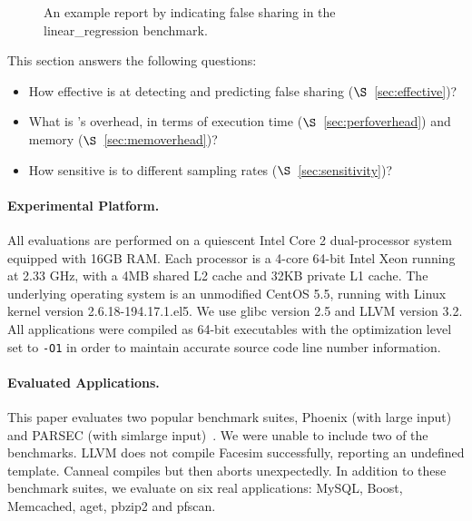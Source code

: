 \begin{figure}[htb]
{\centering
\tiny
\subfigure{}
\caption{An example report by \Predator{} indicating false sharing in the linear\_regression benchmark.
\label{fig:lrreport}}
}
\end{figure}



\label{sec:evaluation}

This section answers the following questions:
\begin{itemize}
\item
  How effective is \Predator{} at detecting and predicting false sharing ($\S$~\ref{sec:effective})?

\item
  What is \Predator{}'s overhead, in terms of execution time ($\S$~\ref{sec:perfoverhead}) and memory ($\S$~\ref{sec:memoverhead})?

\item 
  How sensitive is \Predator{} to different sampling rates ($\S$~\ref{sec:sensitivity})? 
 
\end{itemize}


\paragraph{Experimental Platform.} All evaluations are performed on a quiescent Intel Core 2 dual-processor system equipped with 
16GB RAM. Each processor is a 4-core 64-bit Intel Xeon running at 2.33 GHz, with a 4MB shared L2 cache and 32KB private L1 cache. The underlying operating system is an unmodified CentOS 5.5, running with Linux kernel version 2.6.18-194.17.1.el5. We use glibc version 2.5 and LLVM version 3.2. 
All applications were compiled as 64-bit executables with the optimization level set to \texttt{-O1} in order to maintain accurate source code line number information.

\paragraph{Evaluated Applications.} 
This paper evaluates two popular benchmark suites,
Phoenix (with large input)~\cite{phoenix-hpca} and PARSEC (with simlarge input)~\cite{parsec}. We were unable to include two of the benchmarks. LLVM does not compile Facesim successfully, reporting an undefined template. Canneal compiles but then aborts unexpectedly. In addition to these benchmark suites, 
we evaluate \Predator{} on six real applications: MySQL, Boost, Memcached, aget, pbzip2 and pfscan.



